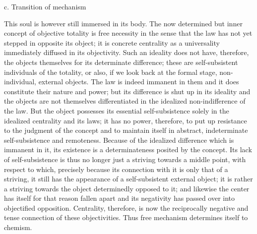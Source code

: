 c. Transition of mechanism

This soul is however still immersed in its body.
The now determined but inner concept of objective totality is
free necessity in the sense that the law
has not yet stepped in opposite its object;
it is concrete centrality as a universality
immediately diffused in its objectivity.
Such an ideality does not have, therefore,
the objects themselves for its determinate difference;
these are self-subsistent individuals of the totality,
or also, if we look back at the formal stage,
non-individual, external objects.
The law is indeed immanent in them
and it does constitute their nature and power;
but its difference is shut up in its ideality
and the objects are not themselves differentiated
in the idealized non-indifference of the law.
But the object possesses its essential self-subsistence
solely in the idealized centrality and its laws;
it has no power, therefore, to put up resistance
to the judgment of the concept
and to maintain itself in abstract, indeterminate
self-subsistence and remoteness.
Because of the idealized difference
which is immanent in it,
its existence is a determinateness posited by the concept.
Its lack of self-subsistence is thus no longer
just a striving towards a middle point,
with respect to which, precisely because
its connection with it is only that of a striving,
it still has the appearance of
a self-subsistent external object;
it is rather a striving towards the object
determinedly opposed to it;
and likewise the center has itself
for that reason fallen apart
and its negativity has passed over
into objectified opposition.
Centrality, therefore, is
now the reciprocally negative
and tense connection of these objectivities.
Thus free mechanism determines itself to chemism.
